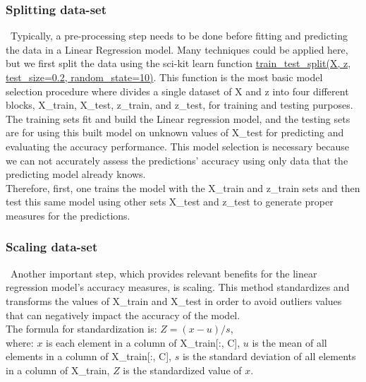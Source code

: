 \subsubsection{Splitting data-set}
\label{chap:Splitting data-set}

\quad \, Typically, a pre-processing step needs to be done before fitting and predicting the data in a Linear Regression model. Many techniques could be applied here, but we first split the data using the sci-kit learn function \href{https://scikit-learn.org/stable/modules/generated/sklearn.model_selection.train_test_split.html}{train\_test\_split(X, z, test\_size=0.2, random\_state=10)}. This function is the most basic model selection procedure where divides a single dataset of X and z into four different blocks, X\_train, X\_test, z\_train, and z\_test, for training and testing purposes. The training sets fit and build the Linear regression model, and the testing sets are for using this built model on unknown values of X\_test for predicting and evaluating the accuracy performance. This model selection is necessary because we can not accurately assess the predictions' accuracy using only data that the predicting model already knows.\\

Therefore, first, one trains the model with the X\_train and z\_train sets and then test this same model using other sets X\_test and z\_test to generate proper measures for the predictions.\\

\subsubsection{Scaling data-set}
\label{chap:Scaling data-set}

\quad \, Another important step, which provides relevant benefits for the linear regression model's accuracy measures, is scaling. This method standardizes and transforms the values of X\_train and X\_test in order to avoid outliers values that can negatively impact the accuracy of the model.\\

The formula for standardization is: $Z = (x - u) / s$,\\

\noindent where: $x$ is each element in a column of X\_train[:, C], $u$ is the mean of all elements in a column of X\_train[:, C], $s$ is the standard deviation of all elements in a column of X\_train, $Z$ is the standardized value of $x$.\\

